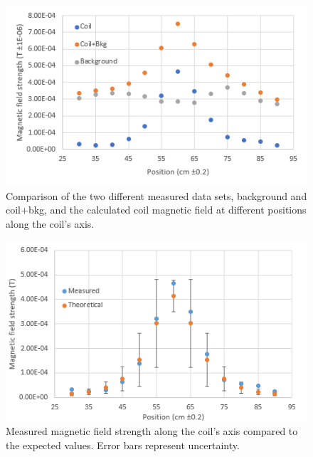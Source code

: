 \begin{figure}[H]
    \centering
    \includegraphics[width = \linewidth]{figures/sets_graph_zoomed.png}
    \caption{Comparison of the two different measured data sets, background and coil+bkg, and the calculated coil magnetic field at different positions along the coil's axis.}
    \label{fig: Sets graph}
\end{figure}

\begin{figure}[H]
    \centering
    \includegraphics[width = \linewidth]{figures/measured_vs_theoretical_revised_zoomed.png}
    \caption{Measured magnetic field strength along the coil's axis compared to the expected values. Error bars represent uncertainty.}
    \label{fig: Measured vs theoretical}
\end{figure}


